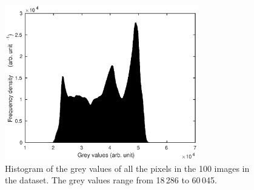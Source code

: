 \documentclass[12pt]{report}
\begin{document}
\begin{figure}[htp]
\centering
\includegraphics[width=0.75\textwidth]{figures/block_histogram.eps}
\caption{Histogram of the grey values of all the pixels in the 100 images in the dataset. The grey values range from 18\,286 to 60\,045.}
\label{fig:block_histogram}
\end{figure}
\end{document}
